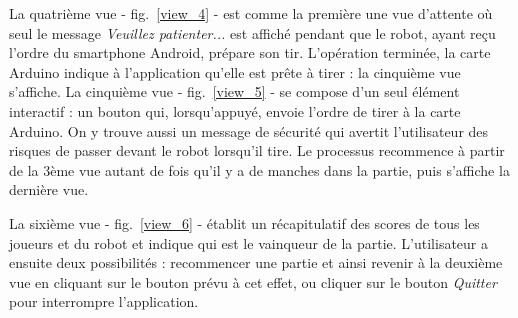 La quatrième vue - fig.~\ref{view_4} - est comme la première une vue d’attente où seul le message \emph{Veuillez patienter...} est affiché pendant que le robot, ayant reçu l’ordre du smartphone Android, prépare son tir. L’opération terminée, la carte Arduino indique à l’application qu’elle est prête à tirer : la cinquième vue s’affiche.
La cinquième vue - fig.~\ref{view_5} - se compose d’un seul élément interactif : un bouton qui, lorsqu’appuyé, envoie l’ordre de tirer à la carte Arduino. On y trouve aussi un message de sécurité qui avertit l’utilisateur des risques de passer devant le robot lorsqu’il tire. Le processus recommence à partir de la 3ème vue autant de fois qu’il y a de manches dans la partie, puis s’affiche la dernière vue.

La sixième vue - fig.~\ref{view_6} - établit un récapitulatif des scores de tous les joueurs et du robot et indique qui est le vainqueur de la partie. L’utilisateur a ensuite deux possibilités : recommencer une partie et ainsi revenir à la deuxième vue en cliquant sur le bouton prévu à cet effet, ou cliquer sur le bouton \emph{Quitter} pour interrompre l’application.

